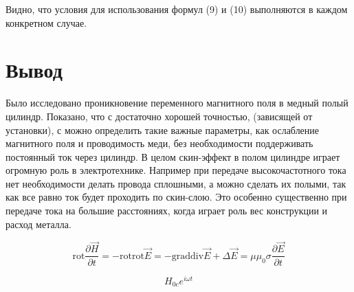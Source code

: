 \documentclass[a4paper, 14pt]{extarticle}%
\begin{document}
Видно, что условия для использования формул (9) и (10) выполняются в каждом конкретном случае.

 \section*{Вывод}
Было исследовано проникновение переменного магнитного поля в медный полый цилиндр. Показано, что с достаточно хорошей точностью, (зависящей от установки), с можно определить такие важные параметры, как ослабление магнитного поля и проводимость меди, без необходимости поддерживать постоянный ток через цилиндр. В целом скин-эффект в полом цилиндре играет огромную роль в электротехнике. Например при передаче высокочастотного тока нет необходимости делать провода сплошными, а можно сделать их полыми, так как все равно ток будет проходить по скин-слою. Это особенно существенно при передаче тока на большие расстояниях, когда играет роль вес конструкции и расход металла. 





\[\text{rot}\dfrac{\partial\overrightarrow{H}}{\partial t} = - \text{rotrot} \overrightarrow{E} = -\text{graddiv}\overrightarrow{E} + \Delta\overrightarrow{E} =  
\mu\mu_0\sigma\dfrac{\partial\overrightarrow{E}}{\partial t} \]

\[H_{0c}e^{i\omega t}\]
\end{document}
